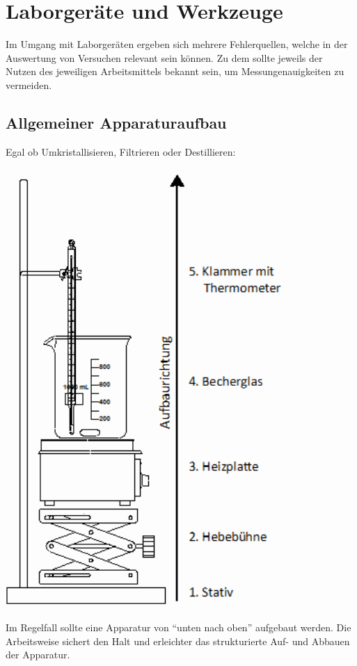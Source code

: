 \section{Laborgeräte und Werkzeuge}
Im Umgang mit Laborgeräten ergeben sich mehrere Fehlerquellen, welche in der Auswertung von Versuchen relevant sein können. Zu dem sollte jeweils der Nutzen des jeweiligen Arbeitsmittels bekannt sein, um Messungenauigkeiten zu vermeiden.



\subsection{Allgemeiner Apparaturaufbau}
Egal ob Umkristallisieren, Filtrieren oder Destillieren:\\
\begin{minipage}{0.45\textwidth}
	\includegraphics[width=0.8\textwidth]{img/Grundaufbau_Apparatur.png}
\end{minipage}
\begin{minipage}[b]{0.55\textwidth}
		 Im Regelfall sollte eine Apparatur von "`unten nach oben"' aufgebaut werden. Die Arbeitsweise sichert den Halt und erleichter das strukturierte Auf- und Abbauen der Apparatur.
\end{minipage}
